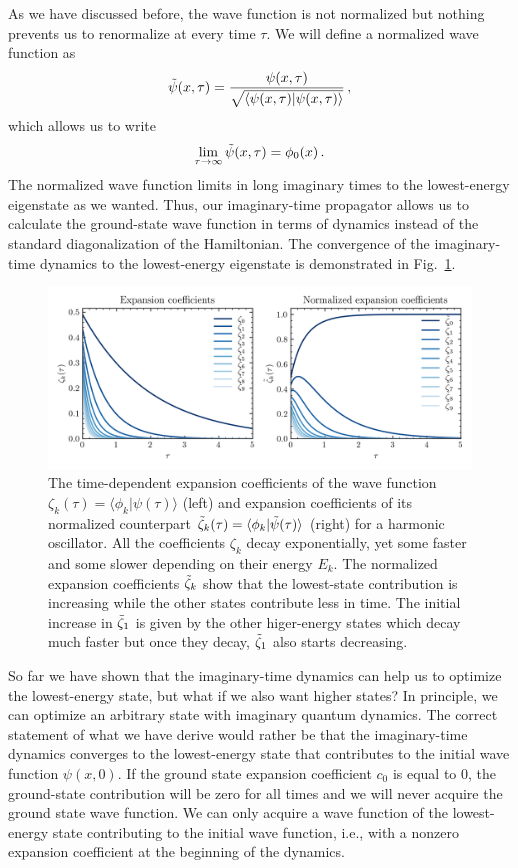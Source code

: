 As we have discussed before, the wave function is not normalized but nothing prevents us to renormalize at every time $\tau$. We will define a normalized wave function as
\begin{equation}
    \Tilde{\psi}(x,\tau) = \frac{\psi(x,\tau)}{\sqrt{\langle\psi(x,\tau) | \psi(x,\tau) \rangle}} \, ,
\end{equation}
which allows us to write 
\begin{equation}
    \lim_{\tau\to\infty} \Tilde{\psi}(x,\tau) = \phi_0(x) \, .
\end{equation}
The normalized wave function limits in long imaginary times to the lowest-energy eigenstate as we wanted. Thus, our imaginary-time propagator allows us to calculate the ground-state wave function in terms of dynamics instead of the standard diagonalization of the Hamiltonian. The convergence of the imaginary-time dynamics to the lowest-energy eigenstate is demonstrated in Fig.~\ref{fig:itqd1}.

\begin{figure}[ht!]
    \centering
    \includegraphics[width=0.9\linewidth]{scriptum/obrazky/itqd/itqd1.png}
    \caption{The time-dependent expansion coefficients of the wave function $\zeta_k(\tau) = \langle \phi_k | \psi(\tau) \rangle$ (left) and expansion coefficients of its normalized counterpart $\Tilde{\zeta}_k(\tau) = \langle \phi_k | \Tilde{\psi}(\tau) \rangle$ (right) for a harmonic oscillator. All the coefficients $\zeta_k$ decay exponentially, yet some faster and some slower depending on their energy $E_k$. The normalized expansion coefficients $\Tilde{\zeta}_k$ show that the lowest-state contribution is increasing while the other states contribute less in time. The initial increase in $\Tilde{\zeta}_1$ is given by the other higer-energy states which decay much faster but once they decay, $\Tilde{\zeta}_1$ also starts decreasing.}
    \label{fig:itqd1}
\end{figure}


So far we have shown that the imaginary-time dynamics can help us to optimize the lowest-energy state, but what if we also want higher states? In principle, we can optimize an arbitrary state with imaginary quantum dynamics. The correct statement of what we have derive would rather be that the imaginary-time dynamics converges to the lowest-energy state that contributes to the initial wave function $\psi(x,0)$. If the ground state expansion coefficient $c_0$ is equal to 0, the ground-state contribution will be zero for all times and we will never acquire the ground state wave function. We can only acquire a wave function of the lowest-energy state contributing to the initial wave function, i.e., with a nonzero expansion coefficient at the beginning of the dynamics.

